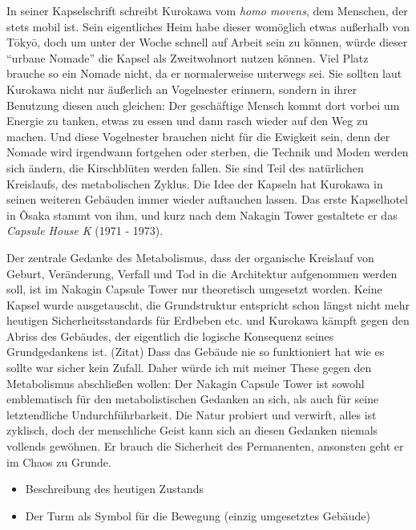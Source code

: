 \documentclass[a4paper, 12pt]{article}
\begin{document}
\begin{onehalfspace}
In seiner Kapselschrift schreibt Kurokawa vom \emph{homo movens}, dem Menschen, der stets mobil ist. Sein eigentliches Heim habe dieser womöglich etwas außerhalb von Tōkyō, doch um unter der Woche schnell auf Arbeit sein zu können, würde dieser “urbane Nomade” die Kapsel als Zweitwohnort nutzen können. Viel Platz brauche so ein Nomade nicht, da er normalerweise unterwegs sei. Sie sollten laut Kurokawa nicht nur äußerlich an Vogelnester erinnern, sondern in ihrer Benutzung diesen auch gleichen: Der geschäftige Mensch kommt dort vorbei um Energie zu tanken, etwas zu essen und dann rasch wieder auf den Weg zu machen. Und diese Vogelnester brauchen nicht für die Ewigkeit sein, denn der Nomade wird irgendwann fortgehen oder sterben, die Technik und Moden werden sich ändern, die Kirschblüten werden fallen. Sie sind Teil des natürlichen Kreislaufs, des metabolischen Zyklus. Die Idee der Kapseln hat Kurokawa in seinen weiteren Gebäuden immer wieder auftauchen lassen. Das erste Kapselhotel in Ôsaka stammt von ihm, und kurz nach dem Nakagin Tower gestaltete er das \emph{Capsule House K} (1971 - 1973). 


Der zentrale Gedanke des Metabolismus, dass der organische Kreislauf von Geburt, Veränderung, Verfall und Tod in die Architektur aufgenommen werden soll, ist im Nakagin Capsule Tower nur theoretisch umgesetzt worden. Keine Kapsel wurde ausgetauscht, die Grundstruktur entspricht schon längst nicht mehr heutigen Sicherheitsstandards für Erdbeben etc. und Kurokawa kämpft gegen den Abriss des Gebäudes, der eigentlich die logische Konsequenz seines Grundgedankens ist. (Zitat) Dass das Gebäude nie so funktioniert hat wie es sollte war sicher kein Zufall.
Daher würde ich mit meiner These gegen den Metabolismus abschließen wollen: Der Nakagin Capsule Tower ist sowohl emblematisch für den metabolistischen Gedanken an sich, als auch für seine letztendliche Undurchführbarkeit. Die Natur probiert und verwirft, alles ist zyklisch, doch der menschliche Geist kann sich an diesen Gedanken niemals vollends gewöhnen. Er brauch die Sicherheit des Permanenten, ansonsten geht er im Chaos zu Grunde. 


\begin{itemize}
  \item Beschreibung des heutigen Zustands 
  \item Der Turm als Symbol für die Bewegung (einzig umgesetztes Gebäude)
\end{itemize}




\end{onehalfspace}
\end{document}
